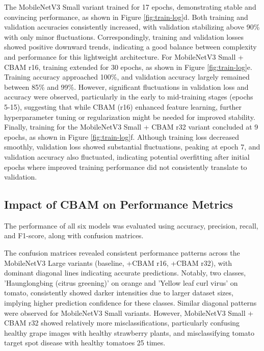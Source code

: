 \documentclass[preprint,12pt]{elsarticle}
\begin{document}
The MobileNetV3 Small variant trained for 17 epochs, demonstrating stable and convincing performance, as shown in Figure \ref{fig:train-log}d. Both training and validation accuracies consistently increased, with validation stabilizing above 90\% with only minor fluctuations. Correspondingly, training and validation losses showed positive downward trends, indicating a good balance between complexity and performance for this lightweight architecture. For MobileNetV3 Small + CBAM r16, training extended for 30 epochs, as shown in Figure \ref{fig:train-log}e. Training accuracy approached 100\%, and validation accuracy largely remained between 85\% and 99\%. However, significant fluctuations in validation loss and accuracy were observed, particularly in the early to mid-training stages (epochs 5-15), suggesting that while CBAM (r16) enhanced feature learning, further hyperparameter tuning or regularization might be needed for improved stability. Finally, training for the MobileNetV3 Small + CBAM r32 variant concluded at 9 epochs, as shown in Figure \ref{fig:train-log}f. Although training loss decreased smoothly, validation loss showed substantial fluctuations, peaking at epoch 7, and validation accuracy also fluctuated, indicating potential overfitting after initial epochs where improved training performance did not consistently translate to validation.

\subsection{Impact of CBAM on Performance Metrics}

The performance of all six models was evaluated using accuracy, precision, recall, and F1-score, along with confusion matrices.

The confusion matrices revealed consistent performance patterns across the MobileNetV3 Large variants (baseline, +CBAM r16, +CBAM r32), with dominant diagonal lines indicating accurate predictions.
 Notably, two classes, 'Haunglongbing (citrus greening)' on orange and 'Yellow leaf curl virus' on tomato, consistently showed darker intensities due to larger dataset sizes, implying higher prediction confidence for these classes. Similar diagonal patterns were observed for MobileNetV3 Small variants. However, MobileNetV3 Small + CBAM r32 showed relatively more misclassifications, particularly confusing healthy grape images with healthy strawberry plants, and misclassifying tomato target spot disease with healthy tomatoes 25 times.
\end{document}
